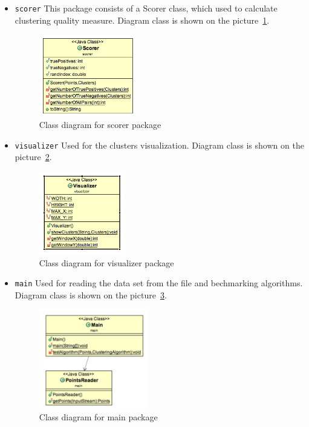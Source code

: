 \documentclass[12pt, a4paper, notitlepage, oneside]{article}
\begin{document}
\begin{itemize}
	\item \texttt{scorer} This package consists of a Scorer class, which used to calculate clustering quality measure. Diagram class is shown on the picture~\ref{scorer}.

	\begin{figure}[!ht]
 	\centering
	\includegraphics[width=0.4\textwidth]{images/scorer_package.png}
 	\caption[]
	{Class diagram for scorer package}
	\label{scorer}
	\end{figure}

	\item \texttt{visualizer} Used for the clusters visualization. Diagram class is shown on the picture~\ref{visualizer}.

	\begin{figure}[!ht]
 	\centering
	\includegraphics[width=0.35\textwidth]{images/visualizer_package.png}
 	\caption[]
	{Class diagram for visualizer package}
\label{visualizer}
	\end{figure}

	\item \texttt{main} Used for reading the data set from the file and bechmarking algorithms. Diagram class is shown on the picture~\ref{main}.

	\begin{figure}[!ht]
 	\centering
	\includegraphics[width=0.45\textwidth]{images/main_package.png}
 	\caption[]
	{Class diagram for main package}
\label{main}
	\end{figure}

\end{itemize}
\end{document}

